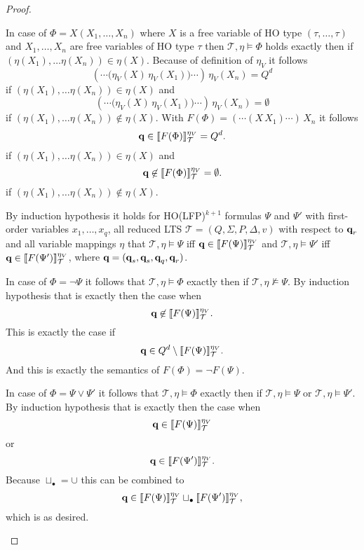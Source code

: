 \begin{proof}
\begin{compactitem}
        \item In case of $\Phi = X(X_1, \dots, X_n)$ where $X$ is a free variable of HO type $(\tau, \dots,
        \tau)$ and $X_1, \dots, X_n$ are free variables of HO type $\tau$ then $\mathcal{T}, \eta \models \Phi$
        holds exactly then if $(\eta(X_1), \dots \eta(X_n)) \in \eta(X)$. Because of definition of $\eta_V$ it follows
        \[(\dotsb\big(\eta_V(X)\,\eta_V(X_1)\big)\dotsb)\,\eta_V(X_n) = Q^d\]
        if $(\eta(X_1), \dots \eta(X_n)) \in \eta(X)$ and
        \[(\dotsb\big(\eta_V(X)\,\eta_V(X_1)\big)\dotsb)\,\eta_V(X_n) = \emptyset\]
        if $(\eta(X_1), \dots \eta(X_n)) \not\in \eta(X)$. With $F(\Phi) = (\dotsb (X\,X_1)\dotsb)\,X_n$
        it follows
        \[ \emph{q} \in \llbracket F(\Phi) \rrbracket^{\eta_V}_\mathcal{T} = Q^d.\]
        if $(\eta(X_1), \dots \eta(X_n))\in \eta(X)$ and
        \[ \emph{q} \not\in \llbracket F(\Phi)
        \rrbracket^{\eta_V}_\mathcal{T} = \emptyset.\]
        if $(\eta(X_1), \dots \eta(X_n)) \not\in \eta(X)$.
    \end{compactitem}
    
    By induction hypothesis it holds for HO(LFP)$^{k+1}$ formulas $\Psi$ and $\Psi'$ with first-order variables $x_1,
    \dots, x_q$, all reduced LTS $\mathcal{T} = (Q, \Sigma, P,
    \Delta, v)$ with respect to $\emph{q}_r$ and all variable mappings $\eta$  that $\mathcal{T}, \eta \models \Psi$ iff $\emph{q} \in \llbracket
   F(\Psi)\rrbracket^{\eta_V}_{\mathcal{T}}$ and $\mathcal{T}, \eta \models \Psi'$ iff $\emph{q} \in \llbracket
   F(\Psi')\rrbracket^{\eta_V}_{\mathcal{T}}$, where $\emph{q} =
    (\emph{q}_s, \emph{q}_s, \emph{q}_q, \emph{q}_r)$.
    
    \begin{compactitem}
        \item In case of $\Phi = \neg \Psi$ it follows that $\mathcal{T}, \eta \models \Phi$ exactly then if
        $\mathcal{T}, \eta \not\models \Psi$. By induction hypothesis that is exactly then the case when
        \[ \emph{q} \not\in \llbracket F(\Psi) \rrbracket^{\eta_V}_\mathcal{T}.\]
        This is exactly the case if
        \[ \emph{q} \in Q^d \setminus \llbracket F(\Psi) \rrbracket^{\eta_V}_\mathcal{T}.\]
        And this is exactly the semantics of $F(\Phi) = \neg F(\Psi)$.

        \item In case of $\Phi = \Psi \vee \Psi'$ it follows that $\mathcal{T}, \eta \models \Phi$ exactly then if
        $\mathcal{T}, \eta \models \Psi$ or $\mathcal{T}, \eta \models \Psi'$. By induction hypothesis that is
        exactly then the case when
        \[\emph{q} \in \llbracket F
        (\Psi) \rrbracket^{\eta_V}_\mathcal{T}\]
        or
        \[\emph{q} \in \llbracket F
        (\Psi') \rrbracket^{\eta_V}_\mathcal{T}.\]
        Because $\sqcup_{\bullet} = \cup$ this can be combined to
        \[\emph{q} \in \llbracket F
        (\Psi) \rrbracket^{\eta_V}_\mathcal{T} \sqcup_\bullet \llbracket F
        (\Psi') \rrbracket^{\eta_V}_\mathcal{T},\]
        which is as desired.


\end{compactitem}
\end{proof}
